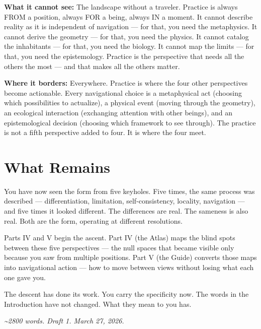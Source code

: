 \textbf{What it cannot see:} The landscape without a traveler. Practice is always FROM a position, always FOR a being, always IN a moment. It cannot describe reality as it is independent of navigation — for that, you need the metaphysics. It cannot derive the geometry — for that, you need the physics. It cannot catalog the inhabitants — for that, you need the biology. It cannot map the limits — for that, you need the epistemology. Practice is the perspective that needs all the others the most — and that makes all the others matter.


\textbf{Where it borders:} Everywhere. Practice is where the four other perspectives become actionable. Every navigational choice is a metaphysical act (choosing which possibilities to actualize), a physical event (moving through the geometry), an ecological interaction (exchanging attention with other beings), and an epistemological decision (choosing which framework to see through). The practice is not a fifth perspective added to four. It is where the four meet.


\bigskip\noindent\makebox[\textwidth]{\color{rulegray}\rule{5cm}{0.3pt}}\bigskip


\section*{What Remains}


You have now seen the form from five keyholes. Five times, the same process was described — differentiation, limitation, self-consistency, locality, navigation — and five times it looked different. The differences are real. The sameness is also real. Both are the form, operating at different resolutions.


Parts IV and V begin the ascent. Part IV (the Atlas) maps the blind spots between these five perspectives — the null spaces that became visible only because you saw from multiple positions. Part V (the Guide) converts those maps into navigational action — how to move between views without losing what each one gave you.


The descent has done its work. You carry the specificity now. The words in the Introduction have not changed. What they mean to you has.


\bigskip\noindent\makebox[\textwidth]{\color{rulegray}\rule{5cm}{0.3pt}}\bigskip


\textit{\textasciitilde{}2800 words. Draft 1. March 27, 2026.}

